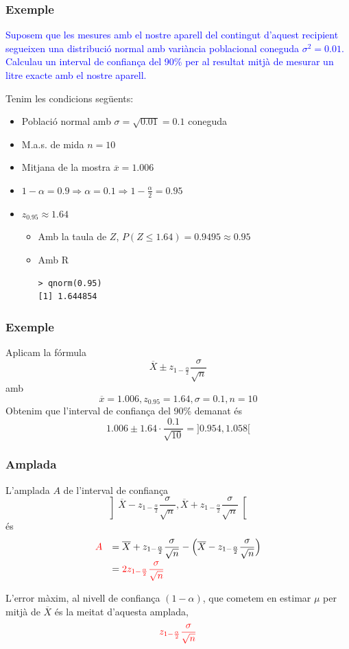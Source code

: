 \documentclass[12pt,t]{beamer}
\newcommand{\red}[1]{\textcolor{red}{#1}}
\newcommand{\blue}[1]{\textcolor{blue}{#1}}
\renewcommand{\emph}[1]{{\color{red}#1}}
\renewcommand{\leq}{\leqslant}
\theoremstyle{plain}
\theoremstyle{definition}
\begin{document}
\begin{frame}[fragile]
\frametitle{Exemple}
\vspace*{-3ex}

\blue{Suposem que les mesures amb el nostre aparell del contingut d'aquest recipient 
segueixen una distribució normal amb variància poblacional coneguda $\sigma^2=0.01$. Calculau un interval de
confiança del 90\% per al resultat mitjà de mesurar un litre exacte amb el nostre aparell.}
\pause\medskip

Tenim les condicions següents:
\begin{itemize}
\item Població normal amb $\sigma=\sqrt{0.01}=0.1$ coneguda
\item M.a.s. de mida $n=10$
\item Mitjana de la mostra  $\overline{x}=1.006$
\item $1-\alpha=0.9\Rightarrow \alpha=0.1\Rightarrow 1-\frac{\alpha}{2}=0.95$
\item $z_{0.95}\approx 1.64$
\begin{itemize}
\item Amb la taula de $Z$, $P(Z\leq 1.64)=0.9495\approx 0.95$

\item Amb R
\begin{verbatim}
> qnorm(0.95)
[1] 1.644854
\end{verbatim}
\end{itemize}
\end{itemize}

\end{frame}

\begin{frame}
\frametitle{Exemple}
Aplicam la fórmula
$$
\overline{X}\pm z_{1-\frac{\alpha}{2}} \frac{\sigma}{\sqrt{n}}
$$
amb
$$
\overline{x}=1.006, z_{0.95}=1.64, \sigma=0.1, n=10
$$
Obtenim que l'interval de confiança del 90\% demanat és
$$
1.006\pm 1.64\cdot\frac{0.1}{\sqrt{10}}=
]0.954 , 1.058[
$$
\end{frame}


\begin{frame}
\frametitle{Amplada}

L'\emph{amplada} $A$ de l'interval de confiança 
$$
\left]\overline{X} -z_{1-\frac{\alpha}{2}} \frac{\sigma}{\sqrt{n}}, \overline{X}+z_{1-\frac{\alpha}{2}}\frac{\sigma}{\sqrt{n}}
\right[
$$
és
$$
\begin{array}{rl}
\red{A}& \displaystyle =\overline{X}+ z_{1-\frac{\alpha}{2}}\frac{\sigma}{\sqrt{n}}-\Big(\overline{X} -z_{1-\frac{\alpha}{2}}\frac{\sigma}{\sqrt{n}}\Big)\\[2ex] & \displaystyle =\red{2z_{1-\frac{\alpha}{2}}\frac{\sigma}{\sqrt{n}}}
\end{array}
$$

L'\emph{error màxim}, al nivell de confiança $(1-\alpha)$, que cometem en estimar $\mu$
per mitjà de $\overline{X}$ és la meitat d'aquesta amplada, 
$$
\red{z_{1-\frac{\alpha}{2}}\frac{\sigma}{\sqrt{n}}}
$$
\end{frame}
\end{document}
